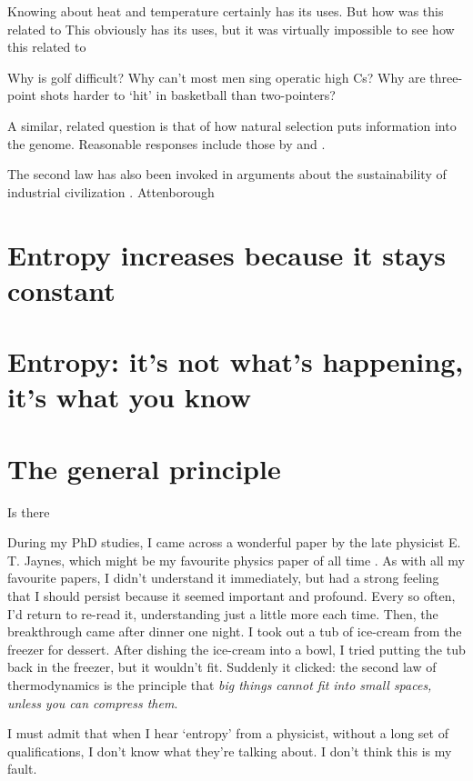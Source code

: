 \documentclass[a4paper, 12pt]{article}
\begin{document}
Knowing about heat and temperature certainly has its uses. But how was this
related to 
This obviously has its uses, but it was virtually impossible to see how this
related to 


Why is golf difficult?
Why can't most men sing operatic high Cs?
Why are three-point shots harder to `hit' in basketball than two-pointers?

A similar, related question is that of how natural selection
puts information into the genome. Reasonable responses include those by
\citep{dawkins2} and \citep{mackay}.

The second law has also been invoked in arguments about the
sustainability of industrial civilization \citep{muse}. Attenborough






\section*{Entropy increases because it stays constant}

\section*{Entropy: it's not what's happening, it's what you know}

\section*{The general principle}
Is there

During my PhD studies, I came across a wonderful paper by the late physicist
E. T. Jaynes, which might be my favourite physics paper of all time
\citep{jaynes}. As with all my favourite papers, I didn't understand it
immediately, but had a strong feeling that I should persist because it seemed
important and profound. Every so often, I'd return to re-read it, understanding
just a little more each time. Then, the breakthrough came after dinner one
night. I took out a tub of ice-cream from the freezer for dessert. After dishing
the ice-cream into a bowl, I tried putting the tub back in the freezer, but
it wouldn't fit. Suddenly it clicked: the second law of thermodynamics is the
principle that {\em big things cannot fit into small spaces, unless you can
compress them}.

I must admit that when I hear `entropy' from a physicist, without a long
set of qualifications, I don't know what they're talking about.
I don't think this is my fault.
\end{document}
